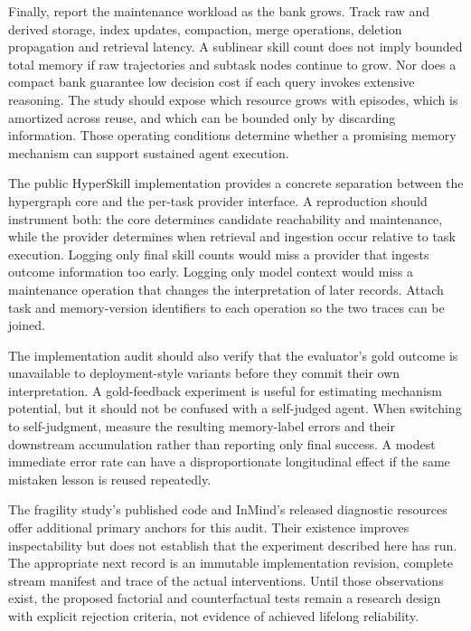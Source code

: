 Finally, report the maintenance workload as the bank grows. Track raw and derived storage, index updates, compaction, merge operations, deletion propagation and retrieval latency. A sublinear skill count does not imply bounded total memory if raw trajectories and subtask nodes continue to grow. Nor does a compact bank guarantee low decision cost if each query invokes extensive reasoning. The study should expose which resource grows with episodes, which is amortized across reuse, and which can be bounded only by discarding information. Those operating conditions determine whether a promising memory mechanism can support sustained agent execution.

The public HyperSkill implementation provides a concrete separation between the hypergraph core and the per-task provider interface\cite{xu2026hyperskill}. A reproduction should instrument both: the core determines candidate reachability and maintenance, while the provider determines when retrieval and ingestion occur relative to task execution. Logging only final skill counts would miss a provider that ingests outcome information too early. Logging only model context would miss a maintenance operation that changes the interpretation of later records. Attach task and memory-version identifiers to each operation so the two traces can be joined.

The implementation audit should also verify that the evaluator's gold outcome is unavailable to deployment-style variants before they commit their own interpretation. A gold-feedback experiment is useful for estimating mechanism potential, but it should not be confused with a self-judged agent. When switching to self-judgment, measure the resulting memory-label errors and their downstream accumulation rather than reporting only final success. A modest immediate error rate can have a disproportionate longitudinal effect if the same mistaken lesson is reused repeatedly.

The fragility study's published code and InMind's released diagnostic resources offer additional primary anchors for this audit\cite{ye2026fragility,inmind2026}. Their existence improves inspectability but does not establish that the experiment described here has run. The appropriate next record is an immutable implementation revision, complete stream manifest and trace of the actual interventions. Until those observations exist, the proposed factorial and counterfactual tests remain a research design with explicit rejection criteria, not evidence of achieved lifelong reliability.

